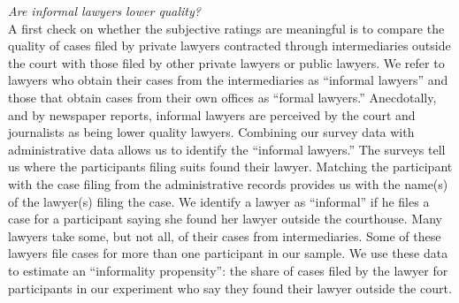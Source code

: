 \documentclass[oneside,12pt]{article}
\begin{document}
\noindent\emph{Are informal lawyers lower quality?}\\
A first check on whether the subjective ratings are meaningful is to compare the quality of cases filed by private lawyers contracted through intermediaries outside the court with those filed by other private lawyers or public lawyers. We refer to lawyers who obtain their cases from the intermediaries as “informal lawyers” and those that obtain cases from their own offices as “formal lawyers.” Anecdotally, and by newspaper reports, informal lawyers are perceived by the court and journalists as being lower quality lawyers. Combining our survey data with administrative data allows us to identify the “informal lawyers.” The surveys tell us where the participants filing suits found their lawyer. Matching the participant with the case filing from the administrative records provides us with the name(s) of the lawyer(s) filing the case. We identify a lawyer as “informal” if he files a case for a participant saying she found her lawyer outside the courthouse. Many lawyers take some, but not all, of their cases from intermediaries. Some of these lawyers file cases for more than one participant in our sample. We use these data to estimate an “informality propensity”: the share of cases filed by the lawyer for participants in our experiment who say they found their lawyer outside the court. 
\end{document}
